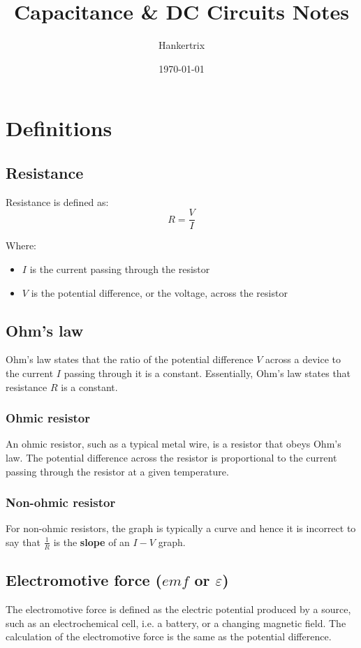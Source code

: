 \documentclass[11pt]{article}
\author{Hankertrix}
\date{\today}
\title{Capacitance \& DC Circuits Notes}
\begin{document}
\maketitle
\setcounter{tocdepth}{2}
\tableofcontents \clearpage\section{Definitions}
\label{sec:org0a1f549}

\subsection{Resistance}
\label{sec:org652642b}
Resistance is defined as:
\[R = \frac{V}{I}\]

Where:
\begin{itemize}
\item \(I\) is the current passing through the resistor
\item \(V\) is the potential difference, or the voltage, across the resistor
\end{itemize}
\subsection{Ohm's law}
\label{sec:orgf198423}
Ohm's law states that the ratio of the potential difference \(V\) across a device to the current \(I\) passing through it is a constant. Essentially, Ohm's law states that resistance \(R\) is a constant.
\subsubsection{Ohmic resistor}
\label{sec:org333da1b}
An ohmic resistor, such as a typical metal wire, is a resistor that obeys Ohm's law. The potential difference across the resistor is proportional to the current passing through the resistor at a given temperature.
\subsubsection{Non-ohmic resistor}
\label{sec:orgf1e5076}
For non-ohmic resistors, the graph is typically a curve and hence it is incorrect to say that \(\frac{1}{R}\) is the \textbf{slope} of an \(I-V\) graph.
\subsection{Electromotive force (\(emf\) or \(\varepsilon\))}
\label{sec:org8525a51}
The electromotive force is defined as the electric potential produced by a source, such as an electrochemical cell, i.e. a battery, or a changing magnetic field. The calculation of the electromotive force is the same as the potential difference.
\end{document}
